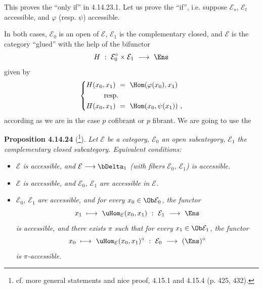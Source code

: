 This proves the ``only if'' in 4.14.23.1. Let us prove the ``if'', i.e. suppose $\mathcal{E}_s$, $\mathcal{E}_t$ accessible, and $\varphi$ (resp. $\psi$) accessible.


In both cases, $\mathcal{E}_0$ is an open of $\mathcal{E}$, $\mathcal{E}_1$ is the complementary closed, and $\mathcal{E}$ is the category ``glued'' with the help of the bifunctor
\[
H\ :\ \mathcal{E}_0^{\circ}\times\mathcal{E}_1\ \longrightarrow\ \Ens
\]
given by
\[
\left\{
\begin{aligned}
H(x_0,x_1)\ &=\ \Hom(\varphi(x_0),x_1)\\
&\hspace{-2em}\text{resp.}\\
H(x_0,x_1)\ &=\ \Hom(x_0,\psi(x_1))\ ,
\end{aligned}
\right.
\]
according as we are in the case $p$ cofibrant or $p$ fibrant. We are going to use the

\textbf{Proposition 4.14.24} (\footnote[173]{cf. more general statements and nice proof, 4.15.1 and 4.15.4 (p. 425, 432).}). \textit{Let $\mathcal{E}$ be a category, $\mathcal{E}_0$ an open subcategory, $\mathcal{E}_1$ the complementary closed subcategory. Equivalent conditions:}
\begin{itemize}[leftmargin=*]
\item[\textit{a)}] \textit{$\mathcal{E}$ is accessible, and $\mathcal{E}\longrightarrow\bDelta_1$ (with fibers $\mathcal{E}_0$, $\mathcal{E}_1$) is accessible.}
\item[\textit{b)}] \textit{$\mathcal{E}$ is accessible, and $\mathcal{E}_0$, $\mathcal{E}_1$ are accessible in $\mathcal{E}$.}
\item[\textit{c)}] \textit{$\mathcal{E}_0$, $\mathcal{E}_1$ are accessible, and for every $x_0\in\Ob\mathcal{E}_0$, the functor}
\[
x_1\ \longmapsto\ \uHom_{\mathcal{E}}(x_0,x_1)\ :\ \mathcal{E}_1\ \longrightarrow\ \Ens
\]
\textit{is accessible, and there exists $\pi$ such that for every $x_1\in\Ob\mathcal{E}_1$, the functor}
\[
x_0\ \longmapsto\ \uHom_{\mathcal{E}}(x_0,x_1)^{\circ}\ :\ \mathcal{E}_0\ \longrightarrow\ (\Ens)^{\circ}
\]
\textit{is $\pi$-accessible.}
\end{itemize}

